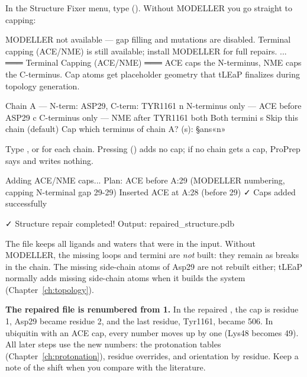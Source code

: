 \begin{steps}
  \item In the Structure Fixer menu, type 
        (). Without MODELLER
        you go straight to capping:
\begin{screen}
MODELLER not available — gap filling and mutations are disabled.
Terminal capping (ACE/NME) is still available; install MODELLER for full
repairs.
...
═══ Terminal Capping (ACE/NME) ═══
ACE caps the N-terminus, NME caps the C-terminus. Cap atoms get placeholder
geometry that tLEaP finalizes during topology generation.

Chain A — N-term: ASP29, C-term: TYR1161
     n  N-terminus only — ACE before ASP29
     c  C-terminus only — NME after TYR1161
  both  Both termini
     s  Skip this chain (default)
Cap which terminus of chain A? (s): §ans«n»
\end{screen}
  \item Type ,  or  for each chain. Pressing
         () adds no cap; if no chain gets a cap, ProPrep says
         and writes nothing.
\begin{screen}
Adding ACE/NME caps...
  Plan: ACE before A:29 (MODELLER numbering, capping N-terminal gap 29-29)
  Inserted ACE at A:28 (before 29)
✓ Caps added successfully

✓ Structure repair completed!
Output: repaired_structure.pdb
\end{screen}
\end{steps}

The file  keeps all ligands and waters that were in
the input. Without MODELLER, the missing loops and termini are \emph{not} built:
they remain as breaks in the chain. The missing side-chain atoms of Asp29 are
not rebuilt either; tLEaP normally adds missing side-chain atoms when it builds
the system (Chapter~\ref{ch:topology}).

\begin{watchout}
\textbf{The repaired file is renumbered from 1.} In the repaired ,
the cap is residue 1, Asp29 became residue 2, and the last residue, Tyr1161,
became 506. In ubiquitin with an ACE cap, every number moves up by one (Lys48
becomes 49). All later steps use the new numbers: the protonation tables
(Chapter~\ref{ch:protonation}), residue overrides, and orientation by residue.
Keep a note of the shift when you compare with the literature.
\end{watchout}

